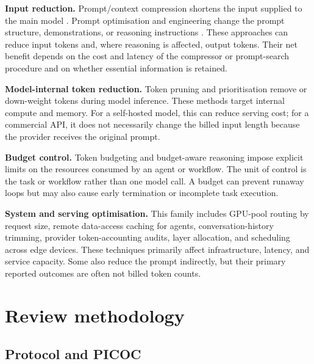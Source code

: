 \IfFileExists{jair.cls}{\documentclass{jair}}{\documentclass[manuscript,nonacm,screen]{acmart}}
\begin{document}
\textbf{Input reduction.} Prompt/context compression shortens the input supplied to the main model \cite{S30,S36,S39}. Prompt optimisation and engineering change the prompt structure, demonstrations, or reasoning instructions \cite{S13,S18,S19}. These approaches can reduce input tokens and, where reasoning is affected, output tokens. Their net benefit depends on the cost and latency of the compressor or prompt-search procedure and on whether essential information is retained.

\textbf{Model-internal token reduction.} Token pruning and prioritisation remove or down-weight tokens during model inference. These methods target internal compute and memory. For a self-hosted model, this can reduce serving cost; for a commercial API, it does not necessarily change the billed input length because the provider receives the original prompt.

\textbf{Budget control.} Token budgeting and budget-aware reasoning impose explicit limits on the resources consumed by an agent or workflow. The unit of control is the task or workflow rather than one model call. A budget can prevent runaway loops but may also cause early termination or incomplete task execution.

\textbf{System and serving optimisation.} This family includes GPU-pool routing by request size, remote data-access caching for agents, conversation-history trimming, provider token-accounting audits, layer allocation, and scheduling across edge devices. These techniques primarily affect infrastructure, latency, and service capacity. Some also reduce the prompt indirectly, but their primary reported outcomes are often not billed token counts.

\section{Review methodology}

\subsection{Protocol and PICOC}
\end{document}
